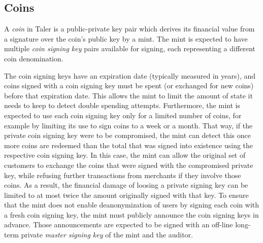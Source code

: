 \documentclass{llncs}
\begin{document}


\subsection{Coins}

A \emph{coin} in Taler is a public-private key pair which derives its
financial value from a signature over the coin's public key by a mint.
The mint is expected to have multiple {\em coin signing key} pairs
available for signing, each representing a different coin
denomination.

The coin signing keys have an expiration date (typically measured in
years), and coins signed with a coin signing key must be spent (or
exchanged for new coins) before that expiration date.  This allows the
mint to limit the amount of state it needs to keep to detect
double spending attempts.  Furthermore, the mint is expected to use each coin
signing key only for a limited number of coins, for example by
limiting its use to sign coins to a week or a month.  That way, if the
private coin signing key were to be compromised, the mint can detect
this once more coins are redeemed than the total that was signed into
existence using the respective coin signing key.  In this case, the
mint can allow the original set of customers to exchange the coins
that were signed with the compromised private key, while refusing
further transactions from merchants if they involve those coins.  As a
result, the financial damage of loosing a private signing key can be
limited to at most twice the amount originally signed with that key.
To ensure that the mint does not enable deanonymization of users by
signing each coin with a fresh coin signing key, the mint must
publicly announce the coin signing keys in advance.  Those
announcements are expected to be signed with an off-line long-term
private {\em master signing key} of the mint and the auditor.
\end{document}
